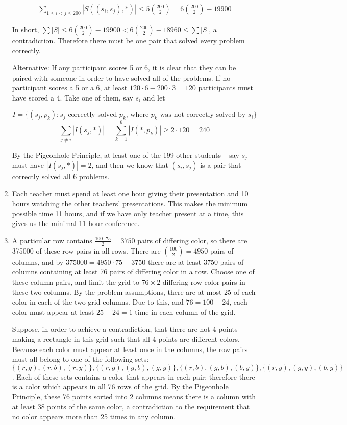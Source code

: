 \documentclass{book}
\numberwithin{equation}{section}
\begin{document}
\begin{enumerate}[label={7.\arabic*}]
\begin{align*}
\sum_{1 \leq i < j \leq 200} |S \left( (s_i, s_j), * \right)| \leq 5{200 \choose 2} = 6{200 \choose 2} - 19900
\end{align*}

In short, $\sum |S| \leq 6{200 \choose 2} - 19900 < 6{200 \choose 2} - 18960 \leq \sum |S|$, a contradiction.
Therefore there must be one pair that
solved every problem correctly.

Alternative: If any participant scores 5 or 6, it is clear that they can be paired with someone in order to have
solved all of the problems. If no participant scores a 5 or a 6, at least $120\cdot 6 - 200 \cdot 3 = 120$ participants
must have scored a 4. Take one of them, say $s_i$ and let

$$I = \{ (s_j, p_k ) : s_j \text{ correctly solved } p_k \text{, where } p_k \text{ was not correctly solved by } s_i \}$$
$$\sum_{j \neq i} |I(s_j, *)| = \sum_{k=1}^6 |I(*, p_k)| \geq 2 \cdot 120 = 240$$

By the Pigeonhole Principle, at least one of the 199 other students -- say $s_j$ -- must have $|I(s_j, *)| = 2$, and
then we know that $(s_i, s_j)$ is a pair that correctly solved all 6 problems.

\item
Each teacher must spend at least one hour giving their presentation and 10 hours watching the other teachers'
presentations. This makes the minimum possible time 11 hours, and if we have only teacher present at a time,
this gives us the minimal 11-hour conference.

\item
A particular row contains $\frac{100 \cdot 75}{2} = 3750$ pairs of differing color, so there are 375000 of these
row pairs in all rows. There are ${100 \choose 2} = 4950$ pairs of columns, and by $375000 = 4950\cdot75 + 3750$
there are at least 3750 pairs of columns containing at least 76 pairs of differing color in a row. Choose one of these
column pairs, and limit the grid to $76 \times 2$ differing row color pairs in these two columns. By the problem
assumptions, there are at most 25 of each color in each of the two grid columns. Due to this, and $76 = 100 - 24$,
each color must appear at least $25 - 24 = 1$ time in each column of the grid.

Suppose, in order to achieve a contradiction, that there are not 4 points making a rectangle in this grid such that
all 4 points are different colors. Because each color must appear at least once in the columns, the row pairs must
all belong to one of the following sets: $\{ (r, g), (r, b), (r, y) \}, \{ (r, g), (g, b), (g, y) \}, \{ (r, b), (g, b), (b, y) \}, \{ (r, y), (g, y), (b, y) \}$.
Each of these sets contains a color that appears in each pair; therefore there is a color which appears in all 76
rows of the grid. By the Pigeonhole Principle, these 76 points sorted into 2 columns means there is a column with
at least 38 points of the same color, a contradiction to the requirement that no color appears more than 25 times
in any column.


\end{enumerate}
\end{document}
